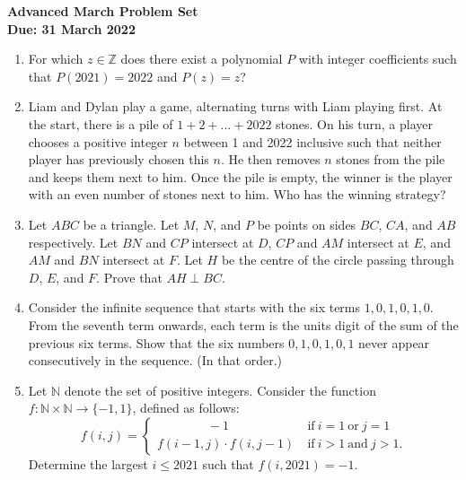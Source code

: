 \documentclass{article}
\newcommand*{\sptext}[1]{\ \text{#1}\ }
\begin{document}
\thispagestyle{empty}

\begin{center}
  \textbf{\Large Advanced March Problem Set}
  \\ \vspace{1em}
  \textbf{\large Due: 31 March 2022}
\end{center}

\medskip

\begin{enumerate}[itemsep=\fill]

\item %
For which $z \in \mathbb{Z}$ does there exist a polynomial $P$ with integer coefficients such that $P(2021) = 2022$ and $P(z) = z$?


\item %
Liam and Dylan play a game, alternating turns with Liam playing first.
At the start, there is a pile of $1+2+...+2022$ stones.
On his turn, a player chooses a positive integer $n$ between 1 and 2022 inclusive such that neither player has previously chosen this $n$.
He then removes $n$ stones from the pile and keeps them next to him.
Once the pile is empty, the winner is the player with an even number of stones next to him.
Who has the winning strategy? 


\item %
Let $ABC$ be a triangle.
Let $M$, $N$, and $P$ be points on sides $BC$, $CA$, and $AB$ respectively.
Let $BN$ and $CP$ intersect at $D$, $CP$ and $AM$ intersect at $E$, and $AM$ and $BN$ intersect at $F$.
Let $H$ be the centre of the circle passing through $D$, $E$, and $F$.
Prove that $AH \perp BC$.


\item %
Consider the infinite sequence that starts with the six terms $1, 0, 1, 0, 1, 0$. From the seventh term onwards, each term is the units digit of the sum of the previous six terms. Show that the six numbers $0, 1, 0, 1, 0, 1$ never appear consecutively in the sequence. (In that order.)


\item %
Let $\mathbb{N}$ denote the set of positive integers. Consider the function $f: \mathbb{N} \times \mathbb{N} \to \{-1,1\}$, defined as follows: 
\[
  f(i,j) = \begin{cases}
    \mspace{72mu} -1 & \sptext{if} i=1 \sptext{or} j=1 \\
    f(i-1,j) \cdot f(i,j-1) & \sptext{if} i>1 \sptext{and} j>1.
  \end{cases}
\]
Determine the largest $i \leq 2021$ such that $f(i,2021) = -1$.



\end{enumerate}
\end{document}
